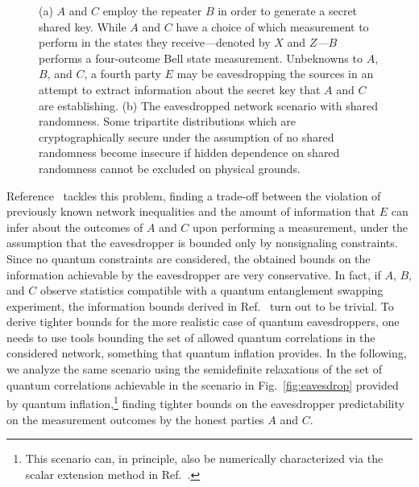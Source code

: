 \documentclass[superscriptaddress,aps,prx,nofootinbib,twocolumn,twoside,reprint,letterpaper,longbibliography]{revtex4-2}
\begin{document}
\begin{figure}[!b]
  \begin{center}
    \hfill
    \hfill
    \hfill
  \end{center}
  \caption[]{(a) $A$ and $C$ employ the repeater $B$ in order to generate a secret shared key. While $A$ and $C$ have a choice of which measurement to perform in the states they receive---denoted by $X$ and $Z$---$B$ performs a four-outcome Bell state measurement. Unbeknowns to $A$, $B$, and $C$, a fourth party $E$ may be eavesdropping the sources in an attempt to extract information about the secret key that $A$ and $C$ are establishing.
  (b) The eavesdropped network scenario with shared randomness. Some tripartite distributions which are cryptographically secure under the assumption of no shared randomness become insecure if hidden dependence on shared randomness cannot be excluded on physical grounds.}
  \label{fig:crypto}
\end{figure}

Reference~\cite{lee2018crypto} tackles this problem, finding a trade-off between the violation of previously known network inequalities and the amount of information that $E$ can infer about the outcomes of $A$ and $C$ upon performing a measurement, under the assumption that the eavesdropper is bounded only by nonsignaling constraints.
Since no quantum constraints are considered, the obtained bounds on the information achievable by the eavesdropper are very conservative. In fact, if $A$, $B$, and $C$ observe statistics compatible with a quantum entanglement swapping experiment, the information bounds derived in Ref.~\cite{lee2018crypto} turn out to be trivial. To derive tighter bounds for the more realistic case of quantum eavesdroppers, one needs to use tools bounding the set of allowed quantum correlations in the considered network, something that quantum inflation provides.
In the following, we analyze the same scenario using the semidefinite relaxations of the set of quantum correlations achievable in the scenario in Fig.~\ref{fig:eavesdrop} provided by quantum inflation,\footnote{This scenario can, in principle, also be numerically characterized via the scalar extension method in Ref.~\cite{Pozas2019}.} finding tighter bounds on the eavesdropper predictability on the measurement outcomes by the honest parties $A$ and $C$.
\end{document}
